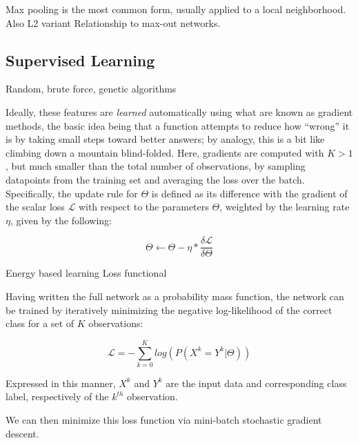 Max pooling is the most common form, usually applied to a local neighborhood.
Also L2 variant
Relationship to max-out networks.


\subsection{Supervised Learning}
\label{subsec:learning}

Random, brute force, genetic algorithms

Ideally, these features are \emph{learned} automatically using what are known as gradient methods, the basic idea being that a function attempts to reduce how ``wrong'' it is by taking small steps toward better answers; by analogy, this is a bit like climbing down a mountain blind-folded.
Here, gradients are computed with $K>1$, but much smaller than the total number of observations, by sampling datapoints from the training set and averaging the loss over the batch.
Specifically, the update rule for $\Theta$ is defined as its difference with the gradient of the scalar loss $\mathcal{L}$ with respect to the parameters $\Theta$, weighted by the learning rate $\eta$, given by the following:

\begin{equation}
\label{eq:updaterule}
\Theta \leftarrow \Theta - \eta * \frac{ \delta \mathcal{L}}{\delta \Theta}
\end{equation}

Energy based learning
Loss functional





Having written the full network as a probability mass function, the network can be trained by iteratively minimizing the negative log-likelihood of the correct class for a set of $K$ observations:

\begin{equation}
\label{eq:nll}
\mathcal{L}=-\sum_{k=0}^K log(P(X^k = Y^k \vert \Theta))
\end{equation}

\noindent Expressed in this manner, $X^k$ and $Y^k$ are the input data and corresponding class label, respectively of the $k^{th}$ observation.

We can then minimize this loss function via mini-batch stochastic gradient descent.



